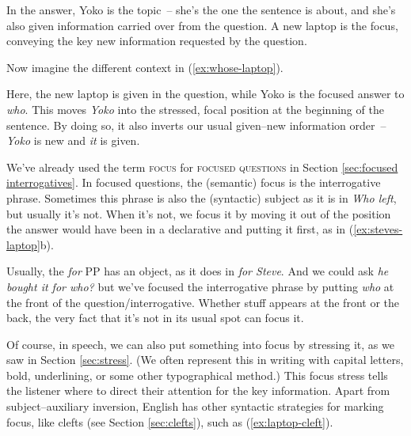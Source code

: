 \label{ex:Yokos-laptop}
\z

In the answer, Yoko is the topic~-- she's the one the sentence is about, and she's also given information carried over from the question. A new laptop is the focus, conveying the key new information requested by the question.

Now imagine the different context in (\ref{ex:whose-laptop}).

\label{ex:whose-laptop}
\z

Here, the new laptop is given in the question, while Yoko is the focused answer to \textit{who}. This moves \textit{Yoko} into the stressed, focal position at the beginning of the sentence. By doing so, it also inverts our usual given--new information order~-- \textit{Yoko} is new and \textit{it} is given.

We've already used the term \textsc{focus} for \textsc{focused questions} in Section \ref{sec:focused interrogatives}. In focused questions, the (semantic) focus is the interrogative phrase. Sometimes this phrase is also the (syntactic) subject as it is in \textit{Who left}, but usually it's not. When it's not, we focus it by moving it out of the position the answer would have been in a declarative and putting it first, as in (\ref{ex:steves-laptop}b). 


Usually, the \textit{for} PP has an object, as it does in \textit{for Steve}. And we could ask \textit{he bought it for who?} but we've focused the interrogative phrase by putting \textit{who} at the front of the question/interrogative. Whether stuff appears at the front or the back, the very fact that it's not in its usual spot can focus it.

Of course, in speech, we can also put something into focus by stressing it, as we saw in Section \ref{sec:stress}. (We often represent this in writing with capital letters, bold, underlining, or some other typographical method.) This focus stress tells the listener where to direct their attention for the key information.
Apart from subject--auxiliary inversion, English has other syntactic strategies for marking focus, like clefts (see Section \ref{sec:clefts}), such as (\ref{ex:laptop-cleft}).

